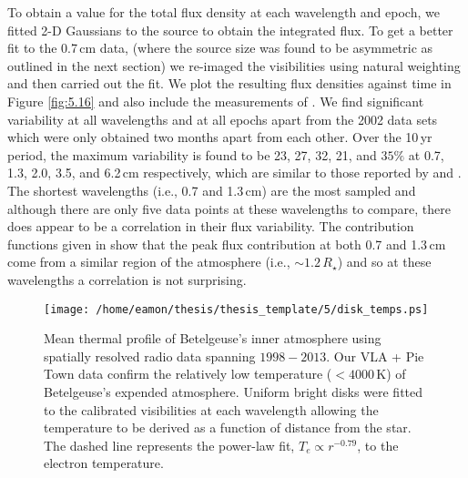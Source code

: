 To obtain a value for the total flux density at each wavelength and epoch, we fitted 2-D Gaussians to the source to obtain the integrated flux. To get a better fit to the 0.7\,cm data, (where the source size was found to be asymmetric as outlined in the next section) we re-imaged the visibilities using natural weighting and then carried out the fit. We plot the resulting flux densities against time in Figure \ref{fig:5.16} and also include the measurements of \cite{lim_1998}. We find significant variability at all wavelengths and at all epochs apart from the 2002 data sets which were only obtained two months apart from each other. Over the 10\,yr period, the maximum variability is found to be 23, 27, 32, 21, and $35\%$ at 0.7, 1.3, 2.0, 3.5, and 6.2\,cm respectively, which are similar to those reported by \cite{drake_1992} and \cite{bookbinder_1987}. The shortest wavelengths (i.e., 0.7 and 1.3\,cm) are the most sampled and although there are only five data points at these wavelengths to compare, there does appear to be a correlation in their flux variability. The contribution functions given in \cite{harper_2001} show that the peak flux contribution at both 0.7 and 1.3\,cm come from a similar region of the atmosphere (i.e., $\sim 1.2\,R_{\star}$) and so at these wavelengths a correlation is not surprising.

\begin{figure}[t!]
\centering
          \texttt{[image: /home/eamon/thesis/thesis\_template/5/disk\_temps.ps]}
\caption[Atmospheric temperature profile between $1998-2013$]{Mean thermal profile of Betelgeuse's inner atmosphere using spatially resolved radio data spanning $1998-2013$. Our VLA + Pie Town data confirm the relatively low temperature ($<4000$\,K) of Betelgeuse's expended atmosphere. Uniform bright disks were fitted to the calibrated visibilities at each wavelength allowing the temperature to be derived as a function of distance from the star. The dashed line represents the power-law fit, $T_{e} \propto r^{-0.79}$, to the electron temperature.}
\label{fig:5.16a}
\end{figure}

